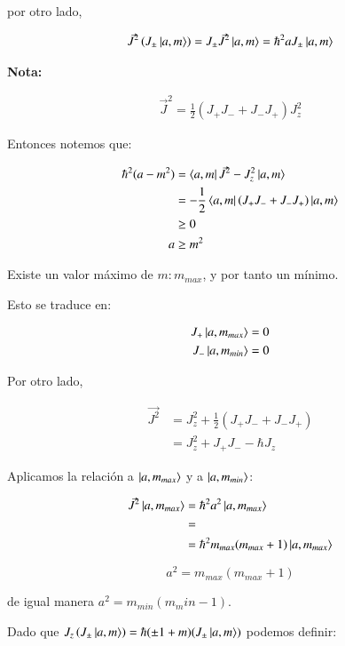por otro lado,

\begin{align*}
    \vec{J}^2\left(J_\pm\ket*{a,m}\right)=J_\pm \vec{J}^2 \ket*{a,m}=\hbar^2aJ_\pm\ket*{a,m}
\end{align*}

\textbf{Nota:}

\begin{align*}
    \vec{J}^2=\frac{1}{2}\left(J_+J_-+J_-J_+\right)J_z^2
\end{align*}

Entonces notemos que:

\begin{align*}
    \hbar^2(a-m^2)
        &=\bra{a,m}\vec{J}^2-J_z^2\ket{a,m}\\
        &=-\frac{1}{2}\bra{a,m}\left(J_+J_-+J_-J_+\right)\ket{a,m}\\
        &\geq 0\\
    a&\geq m^2
\end{align*}

Existe un valor máximo de $m:m_{max}$, y por tanto un mínimo. 

Esto se traduce en:

\begin{align*}
    J_+\ket{a,m_{max}}&=0\\
    J_-\ket{a,m_{min}}&=0
\end{align*}

Por otro lado,

\begin{align*}
    \vec{J^2}
        &=J_z^2+\frac{1}{2}\left(J_+J_-+J_-J_+\right)\\
        &=J_z^2+J_+J_--\hbar J_z
\end{align*}

Aplicamos la relación a $\ket{a,m_{max}}$ y a $\ket{a,m_{min}}$:

\begin{align*}
    \vec{J}^2\ket{a,m_{max}}
        &=\hbar^2a^2\ket{a,m_{max}}\\
        &=\\
        &=\hbar^2 m_{max} (m_{max}+1)\ket{a,m_{max}}
\end{align*}

$$a^2=m_{max}(m_{max}+1)$$

de igual manera $a^2=m_{min}(m_min-1)$.

\medskip

Dado que $J_z\left(J_{\pm}\ket{a,m}\right)=\hbar(\pm1+m)(J_\pm\ket{a,m})$ podemos definir:


